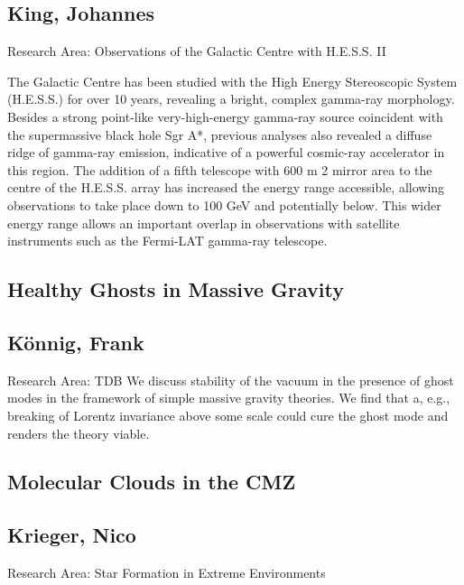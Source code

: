 \subsection*{\centering \normalsize King, Johannes}
Research Area: Observations of the Galactic Centre with H.E.S.S. II\newline

\noindent The Galactic Centre has been studied with the High Energy Stereoscopic System (H.E.S.S.) for over 10 years, revealing a bright, complex gamma-ray morphology. Besides a strong point-like very-high-energy gamma-ray source coincident with the supermassive black hole Sgr A*, previous analyses also revealed a diffuse ridge of gamma-ray emission, indicative of a powerful cosmic-ray accelerator in this region. The addition of a fifth telescope with 600 m 2 mirror area to the centre of the H.E.S.S. array has increased the energy range accessible, allowing observations to take place down to 100 GeV and potentially below. This wider energy range allows an important overlap in observations with satellite instruments such as the Fermi-LAT gamma-ray telescope.
\newpage
\subsection*{\centering \large Healthy Ghosts in Massive Gravity }
\subsection*{\centering \large K\"onnig, Frank}
Research Area: TDB \newline
\noindent  We discuss stability of the vacuum in the presence of ghost modes in the framework of simple
massive gravity theories. We find that a, e.g., breaking of Lorentz invariance above some scale
could cure the ghost mode and renders the theory viable. 


\subsection*{\centering \large Molecular Clouds in the CMZ}
\subsection*{\centering \normalsize Krieger, Nico}
Research Area: Star Formation in Extreme Environments\newline

